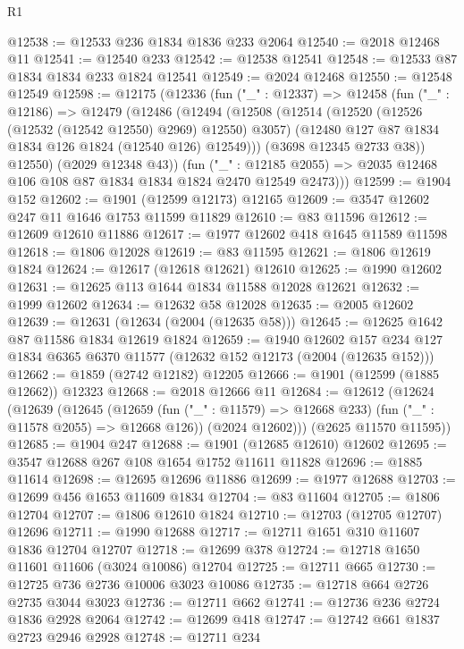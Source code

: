 \begin{lexlean}{R1}
\begin{coremodule}
@12538 := @12533 @236 @1834 @1836 @233 @2064
@12540 := @2018 @12468 @11
@12541 := @12540 @233
@12542 := @12538 @12541
@12548 := @12533 @87 @1834 @1834 @233 @1824 @12541
@12549 := @2024 @12468
@12550 := @12548 @12549
@12598 := @12175
    (@12336
      (fun ("_" : @12337) =>
      @12458
        (fun ("_" : @12186) =>
        @12479
          (@12486
            (@12494
              (@12508
                (@12514
                  (@12520 (@12526 (@12532 (@12542 @12550) @2969) @12550) @3057)
                  (@12480 @127 @87 @1834 @1834 @126 @1824 (@12540 @126) @12549)))
              (@3698 @12345 @2733 @38))
            @12550)
          (@2029 @12348 @43))
        (fun ("_" : @12185 @2055) =>
        @2035 @12468 @106 @108 @87 @1834 @1834 @1824 @2470 @12549 @2473)))
@12599 := @1904 @152
@12602 := @1901 (@12599 @12173) @12165
@12609 := @3547 @12602 @247 @11 @1646 @1753 @11599 @11829
@12610 := @83 @11596
@12612 := @12609 @12610 @11886
@12617 := @1977 @12602 @418 @1645 @11589 @11598
@12618 := @1806 @12028
@12619 := @83 @11595
@12621 := @1806 @12619 @1824
@12624 := @12617 (@12618 @12621) @12610
@12625 := @1990 @12602
@12631 := @12625 @113 @1644 @1834 @11588 @12028 @12621
@12632 := @1999 @12602
@12634 := @12632 @58 @12028
@12635 := @2005 @12602
@12639 := @12631 (@12634 (@2004 (@12635 @58)))
@12645 := @12625 @1642 @87 @11586 @1834 @12619 @1824
@12659 := @1940
    @12602
    @157
    @234
    @127
    @1834
    @6365
    @6370
    @11577
    (@12632 @152 @12173 (@2004 (@12635 @152)))
@12662 := @1859 (@2742 @12182) @12205
@12666 := @1901 (@12599 (@1885 @12662)) @12323
@12668 := @2018 @12666 @11
@12684 := @12612
    (@12624
      (@12639
        (@12645
          (@12659 (fun ("_" : @11579) => @12668 @233) (fun ("_" : @11578 @2055) => @12668 @126))
          (@2024 @12602)))
      (@2625 @11570 @11595))
@12685 := @1904 @247
@12688 := @1901 (@12685 @12610) @12602
@12695 := @3547 @12688 @267 @108 @1654 @1752 @11611 @11828
@12696 := @1885 @11614
@12698 := @12695 @12696 @11886
@12699 := @1977 @12688
@12703 := @12699 @456 @1653 @11609 @1834
@12704 := @83 @11604
@12705 := @1806 @12704
@12707 := @1806 @12610 @1824
@12710 := @12703 (@12705 @12707) @12696
@12711 := @1990 @12688
@12717 := @12711 @1651 @310 @11607 @1836 @12704 @12707
@12718 := @12699 @378
@12724 := @12718 @1650 @11601 @11606 (@3024 @10086) @12704
@12725 := @12711 @665
@12730 := @12725 @736 @2736 @10006 @3023 @10086
@12735 := @12718 @664 @2726 @2735 @3044 @3023
@12736 := @12711 @662
@12741 := @12736 @236 @2724 @1836 @2928 @2064
@12742 := @12699 @418
@12747 := @12742 @661 @1837 @2723 @2946 @2928
@12748 := @12711 @234

\end{coremodule}
\end{lexlean}
